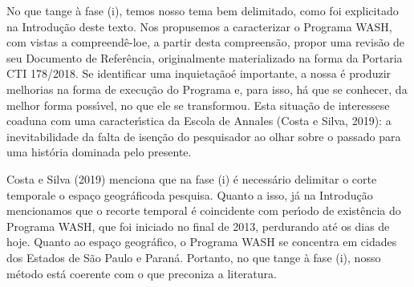 \documentclass[
12pt,		%
openright,	%
twoside,  %
a4paper,			%
chapter=TITLE,		%
english,			%
french,				%
spanish,			%
brazil				%
]{USPSC-classe/USPSC}
\begin{document}
No que tange \`a fase (i), temos nosso tema bem delimitado, como foi explicitado na Introdu\c{c}\~ao deste texto. Nos propusemos a caracterizar o Programa WASH, com vistas a \textquotedbl compreend\^e-lo\textquotedbl  e, a partir desta compreens\~ao, propor uma revis\~ao de seu Documento de Refer\^encia, originalmente materializado na forma da Portaria CTI 178/2018. Se \textquotedbl identificar uma inquieta\c{c}\~ao\textquotedbl  \'e importante, a nossa \'e produzir melhorias na forma de execu\c{c}\~ao do Programa e, para isso, h\'a que se conhecer, da melhor forma poss\'{\i}vel, no que ele se transformou. Esta situa\c{c}\~ao de \textquotedbl interesse\textquotedbl  se coaduna com uma caracter\'{\i}stica da Escola de Annales  (Costa e Silva, 2019): \textquotedbl a inevitabilidade da falta de isen\c{c}\~ao do pesquisador ao olhar sobre o passado para uma hist\'oria dominada pelo presente\textquotedbl .

















Costa e Silva (2019) menciona que na fase (i) \'e necess\'ario delimitar o \textquotedbl corte temporal\textquotedbl  e o \textquotedbl espa\c{c}o geogr\'afico\textquotedbl  da pesquisa.  Quanto a isso, j\'a na Introdu\c{c}\~ao mencionamos que o recorte temporal \'e coincidente com per\'{\i}odo de exist\^encia do Programa WASH, que foi iniciado no final de 2013, perdurando at\'e os dias de hoje. Quanto ao espa\c{c}o geogr\'afico, o Programa WASH se concentra em cidades dos Estados de S\~ao Paulo e Paran\'a. Portanto, no que tange \`a fase (i), nosso m\'etodo est\'a coerente com o que preconiza a literatura.
\end{document}
